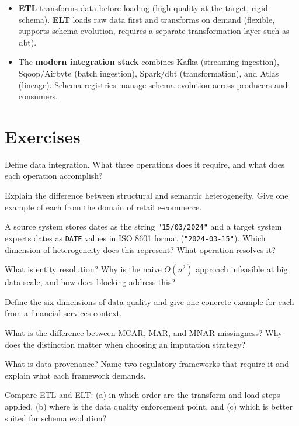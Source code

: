 \begin{itemize}
  \item \textbf{ETL} transforms data before loading (high quality at
        the target, rigid schema). \textbf{ELT} loads raw data first
        and transforms on demand (flexible, supports schema evolution,
        requires a separate transformation layer such as dbt).

  \item The \textbf{modern integration stack} combines Kafka
        (streaming ingestion), Sqoop/Airbyte (batch ingestion),
        Spark/dbt (transformation), and Atlas (lineage). Schema
        registries manage schema evolution across producers and consumers.
\end{itemize}

\section*{Exercises}
\label{sec:ch2-exercises}


\sq Define data integration. What three operations does it require, and
what does each operation accomplish?

\sq Explain the difference between structural and semantic
heterogeneity. Give one example of each from the domain of retail
e-commerce.

\sq A source system stores dates as the string \texttt{"15/03/2024"}
and a target system expects dates as \texttt{DATE} values in ISO 8601
format (\texttt{"2024-03-15"}). Which dimension of heterogeneity does
this represent? What operation resolves it?

\sq What is entity resolution? Why is the naive $O(n^2)$ approach
infeasible at big data scale, and how does blocking address this?

\sq Define the six dimensions of data quality and give one concrete
example for each from a financial services context.

\sq What is the difference between MCAR, MAR, and MNAR missingness?
Why does the distinction matter when choosing an imputation strategy?

\sq What is data provenance? Name two regulatory frameworks that
require it and explain what each framework demands.

\sq Compare ETL and ELT: (a) in which order are the transform and load
steps applied, (b) where is the data quality enforcement point, and (c)
which is better suited for schema evolution?


